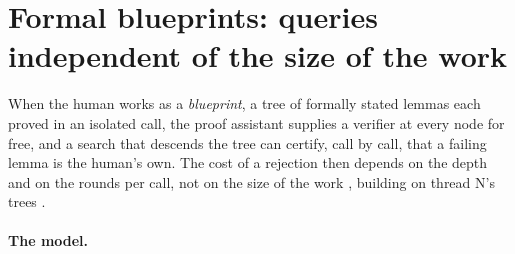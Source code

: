 \documentclass[11pt]{article}
\theoremstyle{definition}
\theoremstyle{remark}
\begin{document}
\section{Formal blueprints: queries independent of the size of the work}\label{sec:trees}

When the human works as a \emph{blueprint}, a tree of formally stated lemmas each proved in an isolated call, the proof assistant supplies a verifier at every node for free, and a search that descends the tree can certify, call by call, that a failing lemma is the human's own. The cost of a rejection then depends on the depth and on the rounds per call, not on the size of the work \cite{threadY}, building on thread N's trees \cite{threadN}.

\paragraph{The model.}
\end{document}
